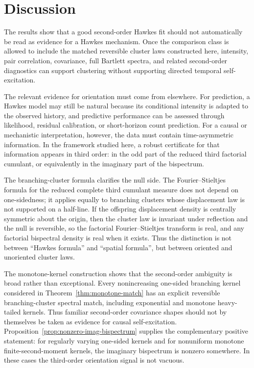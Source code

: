 \documentclass[aap,press]{apt} \volno{00} \partno{00}
\newcommand{\1}{\mathbf{1}}
\numberwithin{equation}{section}
\begin{document}
\section{Discussion}

The results show that a good second-order Hawkes fit should not automatically be read as evidence for a Hawkes mechanism. Once the comparison class is allowed to include the matched reversible cluster laws constructed here, intensity, pair correlation, covariance, full Bartlett spectra, and related second-order diagnostics can support clustering without supporting directed temporal self-excitation.

The relevant evidence for orientation must come from elsewhere. For prediction, a Hawkes model may still be natural because its conditional intensity is adapted to the observed history, and predictive performance can be assessed through likelihood, residual calibration, or short-horizon count prediction. For a causal or mechanistic interpretation, however, the data must contain time-asymmetric information. In the framework studied here, a robust certificate for that information appears in third order: in the odd part of the reduced third factorial cumulant, or equivalently in the imaginary part of the bispectrum.

The branching-cluster formula clarifies the null side. The Fourier--Stieltjes formula for the reduced complete third cumulant measure does not depend on one-sidedness; it applies equally to branching clusters whose displacement law is not supported on a half-line. If the offspring displacement density is centrally symmetric about the origin, then the cluster law is invariant under reflection and the null is reversible, so the factorial Fourier--Stieltjes transform is real, and any factorial bispectral density is real when it exists. Thus the distinction is not between ``Hawkes formula'' and ``spatial formula'', but between oriented and unoriented cluster laws.

The monotone-kernel construction shows that the second-order ambiguity is broad rather than exceptional. Every nonincreasing one-sided branching kernel considered in Theorem~\ref{thm:monotone-match} has an explicit reversible branching-cluster spectral match, including exponential and monotone heavy-tailed kernels. Thus familiar second-order covariance shapes should not by themselves be taken as evidence for causal self-excitation. Proposition~\ref{prop:nonzero-imag-bispectrum} supplies the complementary positive statement: for regularly varying one-sided kernels and for nonuniform monotone finite-second-moment kernels, the imaginary bispectrum is nonzero somewhere. In these cases the third-order orientation signal is not vacuous.
\end{document}
